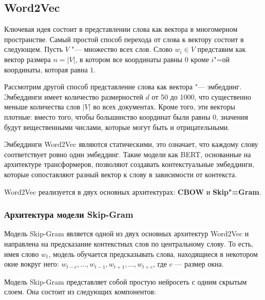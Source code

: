 \documentclass[coursework]{SCWorks}
\begin{document}
\subsection{Word2Vec}
Ключевая идея состоит в представлении слова как вектора в многомерном пространстве. Самый простой способ перехода от слова к вектору состоит в следующем. Пусть $V$ "--- множество всех слов. Слово $w_i \in V$ представим как вектор размера $n = |V|$, в котором все координаты равны $0$ кроме $i$"=ой координаты, которая равна $1$.

Рассмотрим другой способ представление слова как вектора "--- эмбеддинг. Эмбеддинги имеет количество размерностей $d$ от 50 до 1000, что существенно меньше количества слов $|V|$ во всех документах. Кроме того, эти векторы плотные: вместо того, чтобы большинство координат были равны 0, значения будут вещественными числами, которые могут быть и отрицательными.

Эмбеддинги Word2Vec являются статическими, это означает, что каждому слову соответствует ровно один эмбеддинг. Такие модели как BERT, основанные на архитектуре трансформеров, позволяют создавать контекстуальные эмбеддинги, которые сопоставляют разный вектор к слову в зависимости от контекста.

Word2Vec реализуется в двух основных архитектурах: \textbf{CBOW} и \textbf{Skip"=Gram}.

\subsubsection{Архитектура модели Skip-Gram}

Модель Skip-Gram является одной из двух основных архитектур Word2Vec и направлена на предсказание контекстных слов по центральному слову. То есть, имея слово $w_t$, модель обучается предсказывать слова, находящиеся в некотором окне вокруг него: $w_{t-c}, \dots, w_{t-1}, w_{t+1}, \dots, w_{t+c}$, где $c$ — размер окна.


Модель Skip-Gram представляет собой простую нейросеть с одним скрытым слоем. Она состоит из следующих компонентов:
\end{document}
